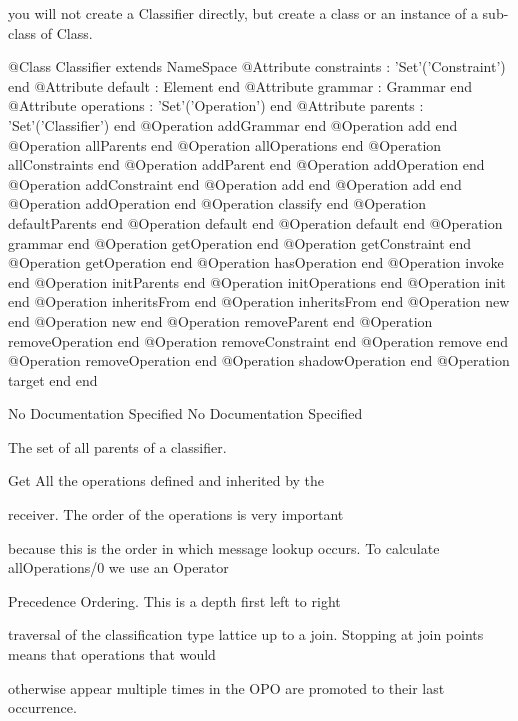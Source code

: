       you will not create a Classifier directly, but create a class or an instance 
      of a sub-class of Class.
\begin{Interface}
@Class Classifier extends NameSpace
  @Attribute constraints : 'Set'('Constraint') end
  @Attribute default : Element end
  @Attribute grammar : Grammar end
  @Attribute operations : 'Set'('Operation') end
  @Attribute parents : 'Set'('Classifier') end
  @Operation addGrammar end
  @Operation add end
  @Operation allParents end
  @Operation allOperations end
  @Operation allConstraints end
  @Operation addParent end
  @Operation addOperation end
  @Operation addConstraint end
  @Operation add end
  @Operation add end
  @Operation addOperation end
  @Operation classify end
  @Operation defaultParents end
  @Operation default end
  @Operation default end
  @Operation grammar end
  @Operation getOperation end
  @Operation getConstraint end
  @Operation getOperation end
  @Operation hasOperation end
  @Operation invoke end
  @Operation initParents end
  @Operation initOperations end
  @Operation init end
  @Operation inheritsFrom end
  @Operation inheritsFrom end
  @Operation new end
  @Operation new end
  @Operation removeParent end
  @Operation removeOperation end
  @Operation removeConstraint end
  @Operation remove end
  @Operation removeOperation end
  @Operation shadowOperation end
  @Operation target end
end
\end{Interface}
No Documentation Specified
No Documentation Specified

      The set of all parents of a  classifier.

      Get All the operations defined and inherited by the

      receiver. The order of the operations is very important

      because this is the order in which message lookup occurs.
      To calculate allOperations/0 we use an Operator

      Precedence Ordering. This is a depth first left to right

      traversal of the classification type lattice up to a join.
      Stopping at join points means that operations that would

      otherwise appear multiple times in the OPO are promoted to 
      their last occurrence.

